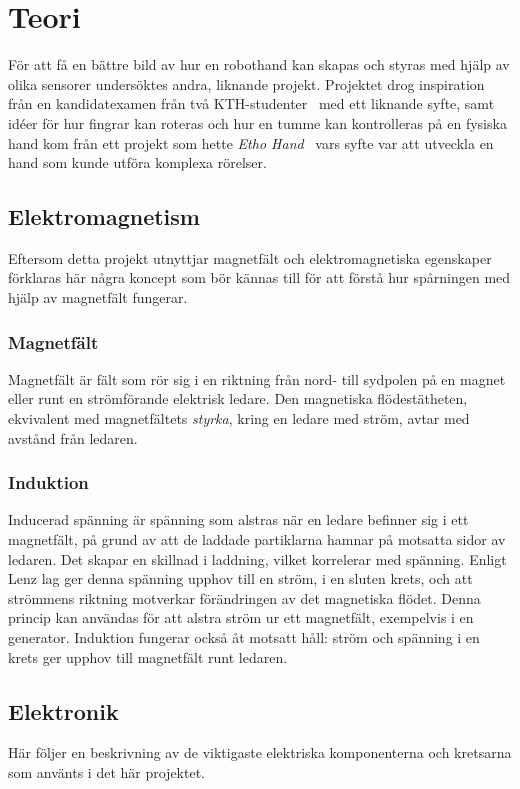 \documentclass[a4paper]{article}
\begin{document}
\begin{sloppypar}
    \newpage
    \section{Teori}
    För att få en bättre bild av hur en robothand kan skapas och styras med hjälp av olika sensorer undersöktes andra, liknande projekt.
    Projektet drog inspiration från en kandidatexamen från två KTH-studenter~\cite{KTHhand} med ett liknande syfte, samt
    idéer för hur fingrar kan roteras och hur en tumme kan kontrolleras på en fysiska hand kom från ett projekt som hette \textit{Etho Hand}~\cite{EthoHand}
    vars syfte var att utveckla en hand som kunde utföra komplexa rörelser.


    \subsection{Elektromagnetism}
    Eftersom detta projekt utnyttjar magnetfält och elektromagnetiska egenskaper förklaras här några koncept som bör kännas till för att förstå hur spårningen med hjälp av magnetfält fungerar.
    \subsubsection{Magnetfält}
    Magnetfält är fält som rör sig i en riktning från nord- till sydpolen på en magnet eller runt en strömförande elektrisk ledare.
    Den magnetiska flödestätheten, ekvivalent med magnetfältets \textit{styrka}, kring en ledare med ström, avtar med avstånd från ledaren.~\cite{digilar}
    \subsubsection{Induktion}
    Inducerad spänning är spänning som alstras när en ledare befinner sig i ett magnetfält, på grund av att de laddade partiklarna hamnar på motsatta sidor av ledaren.
    Det skapar en skillnad i laddning, vilket korrelerar med spänning.
    Enligt Lenz lag ger denna spänning upphov till en ström, i en sluten krets, och att strömmens riktning motverkar förändringen av det magnetiska flödet.
    Denna princip kan användas för att alstra ström ur ett magnetfält, exempelvis i en generator.
    Induktion fungerar också åt motsatt håll: ström och spänning i en krets ger upphov till magnetfält runt ledaren.
    ~\cite{digilar}

    \subsection{Elektronik}
    Här följer en beskrivning av de viktigaste elektriska komponenterna och kretsarna som använts i det här projektet.

\end{sloppypar}
\end{document}
